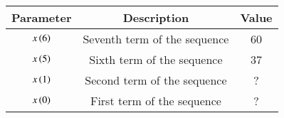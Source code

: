 \begin{tabular}{|c|c|c|}
    \hline
    \textbf{Parameter} & \textbf{Description} & \textbf{Value} \\
    \hline
    $ x\left(6\right)$ & Seventh term of the sequence & 60 \\
    \hline
    $ x\left(5\right)$ & Sixth term of the sequence & 37 \\
    \hline
    $ x\left(1\right)$ & Second term of the sequence & ? \\
    \hline
    $ x\left(0\right)$ & First term of the sequence & ? \\
    \hline
    \end{tabular}

